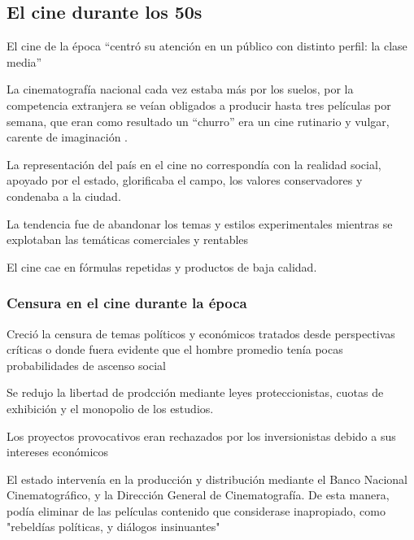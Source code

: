 \subsection{El cine durante los  50s}
\begin{compactitem}
    \item El cine de la época ``centró su atención en un público
    con distinto perfil: la clase media''\autocite[96]{BarcenasSanchez2014}
    \item La cinematografía nacional cada vez estaba más por los suelos, por la competencia extranjera se veían obligados a producir hasta tres películas por semana, que eran como resultado un ``churro'' era un cine rutinario y vulgar, carente de imaginación \autocite[12]{MillanHernandez2004}.
    \item La representación del país en el cine no correspondía con la realidad social, apoyado por el estado, glorificaba el campo, los valores conservadores y  condenaba a la ciudad.\autocite[1]{jones_bunuel_2006} 
    \item La tendencia fue de abandonar los temas y estilos experimentales mientras se explotaban las temáticas comerciales y rentables \autocite[24]{baugh_developing_2004}
    \item El cine cae en fórmulas repetidas y productos de baja calidad.\autocite[522]{peter_desarrollo_2008} 
\end{compactitem}

    \subsubsection{Censura en el cine durante la época}
    \begin{compactitem}
    \item Creció la censura de temas políticos y económicos tratados desde perspectivas críticas o donde fuera evidente que el hombre promedio tenía pocas probabilidades de ascenso social \autocite[100]{BarcenasSanchez2014}
    \item Se redujo la libertad de prodcción mediante leyes proteccionistas, cuotas de exhibición y el monopolio de los estudios.\autocite[25]{baugh_developing_2004}
    \item Los proyectos provocativos eran rechazados por los inversionistas debido a sus intereses económicos\autocite[28]{baugh_developing_2004}
    \item El estado intervenía en la producción y distribución mediante el Banco Nacional Cinematográfico, y la Dirección General de Cinematografía\autocite[29]{baugh_developing_2004}. De esta manera, podía eliminar de las películas contenido que considerase inapropiado, como "rebeldías políticas, y diálogos insinuantes"\autocite[28]{baugh_developing_2004}
    \end{compactitem} 

